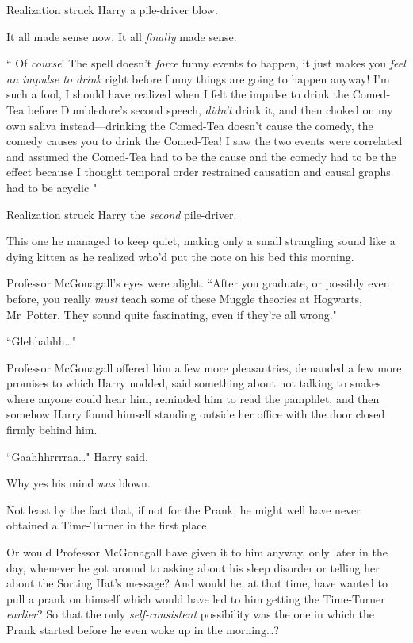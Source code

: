 Realization struck Harry a pile-driver blow.

It all made sense now. It all \emph{finally} made sense.

`` Of \emph{course}! The spell doesn't \emph{force} funny events to happen, it just makes you \emph{feel an impulse to drink} right before funny things are going to happen anyway! I'm such a fool, I should have realized when I felt the impulse to drink the Comed-Tea before Dumbledore's second speech, \emph{didn't} drink it, and then choked on my own saliva instead—drinking the Comed-Tea doesn't cause the comedy, the comedy causes you to drink the Comed-Tea! I saw the two events were correlated and assumed the Comed-Tea had to be the cause and the comedy had to be the effect because I thought temporal order restrained causation and causal graphs had to be acyclic "

Realization struck Harry the \emph{second} pile-driver.

This one he managed to keep quiet, making only a small strangling sound like a dying kitten as he realized who'd put the note on his bed this morning.

Professor McGonagall's eyes were alight. ``After you graduate, or possibly even before, you really \emph{must} teach some of these Muggle theories at Hogwarts, Mr~Potter. They sound quite fascinating, even if they're all wrong."

``Glehhahhh{\ldots}"

Professor McGonagall offered him a few more pleasantries, demanded a few more promises to which Harry nodded, said something about not talking to snakes where anyone could hear him, reminded him to read the pamphlet, and then somehow Harry found himself standing outside her office with the door closed firmly behind him.

``Gaahhhrrrraa{\ldots}" Harry said.

Why yes his mind \emph{was} blown.

Not least by the fact that, if not for the Prank, he might well have never obtained a Time-Turner in the first place.

Or would Professor McGonagall have given it to him anyway, only later in the day, whenever he got around to asking about his sleep disorder or telling her about the Sorting Hat's message? And would he, at that time, have wanted to pull a prank on himself which would have led to him getting the Time-Turner \emph{earlier}? So that the only \emph{self-consistent} possibility was the one in which the Prank started before he even woke up in the morning{\ldots}?


